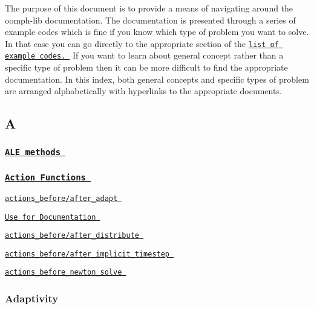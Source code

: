 The purpose of this document is to provide a means of navigating around the {\ttfamily oomph-\/lib} documentation. The documentation is presented through a series of example codes which is fine if you know which type of problem you want to solve. In that case you can go directly to the appropriate section of the \href{../../example_code_list/html/index.html}{\tt list of example codes. } If you want to learn about general concept rather than a specific type of problem then it can be more difficult to find the appropriate documentation. In this index, both general concepts and specific types of problem are arranged alphabetically with hyperlinks to the appropriate documents.



 

  \subsection*{ A }

 \subsubsection*{ \href{ ../../unsteady_heat/two_d_unsteady_heat_ALE/html/index.html#ale }{\tt A\-L\-E methods } }

\subsubsection*{ \href{ ../../order_of_action_functions/html/index.html }{\tt Action Functions } }


\begin{DoxyItemize}
\item  \href{ ../../poisson/fish_poisson/html/index.html#adapt_bc }{\tt actions\-\_\-before/after\-\_\-adapt }  
\begin{DoxyItemize}
\item  \href{ ../../advection_diffusion/two_d_adv_diff_adapt/html/index.html#problem }{\tt Use for Documentation }  
\end{DoxyItemize}
\item  \href{ ../../mpi/two_d_poisson_flux_bc_adapt/html/index.html }{\tt actions\-\_\-before/after\-\_\-distribute }  
\item  \href{ ../../unsteady_heat/two_d_unsteady_heat/html/index.html#before_timestep }{\tt actions\-\_\-before/after\-\_\-implicit\-\_\-timestep }  
\item  \href{ ../../poisson/one_d_poisson/html/index.html#actions_before }{\tt actions\-\_\-before\-\_\-newton\-\_\-solve }  
\end{DoxyItemize}\subsubsection*{ Adaptivity }

